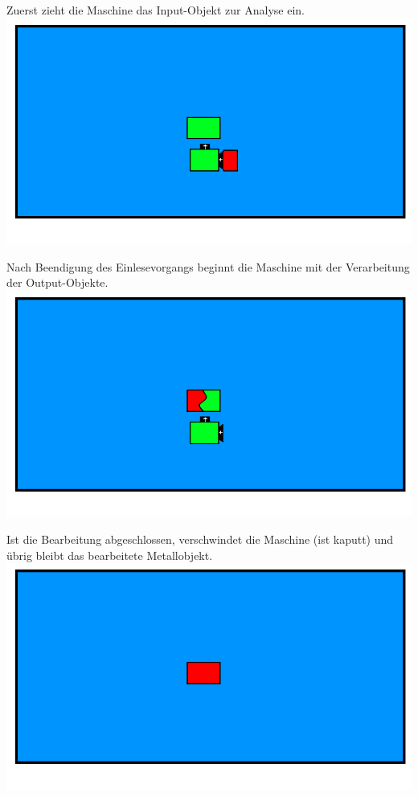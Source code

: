 \documentclass{scrartcl}
\begin{document}
\begin{description}
		\begin{minipage}{1\textwidth}
			Zuerst zieht die Maschine das Input-Objekt zur Analyse ein.\\ 
			\includegraphics[scale=0.5]{assets/AuswertungAnimPic2}
		\end{minipage}
		
		\begin{minipage}{1\textwidth}
			Nach Beendigung des Einlesevorgangs beginnt die Maschine mit der Verarbeitung der Output-Objekte.\\ 
			\includegraphics[scale=0.5]{assets/AuswertungAnimPic3}
		\end{minipage}
		
		\begin{minipage}{1\textwidth}
			Ist die Bearbeitung abgeschlossen, verschwindet die Maschine (ist kaputt) und übrig bleibt das bearbeitete Metallobjekt.\\ 
			\includegraphics[scale=0.5]{assets/AuswertungAnimPic5}
		\end{minipage}
		

\end{description}
\end{document}
